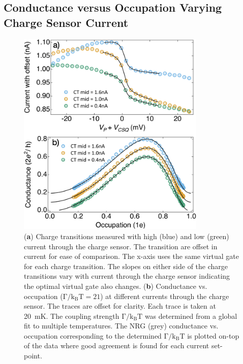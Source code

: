 \subsection{Conductance versus Occupation Varying Charge Sensor Current}



\begin{figure}[!bht]
  \begin{center}
    \includegraphics[width=0.8\textwidth]{figures/ch3/crop_FiguresMaster.017.png}
    \caption[Conductance vs. Occupation : Varying the current through the charge sensor]{\label{fig:ch3/cond_occ_QPC_vs_ct} 
    (\textbf{a}) Charge transitions measured with high (blue) and low (green) current through the charge sensor. The transition are offset in current for ease of comparison. The x-axis uses the same virtual gate for each charge transition. The slopes on either side of the charge transitions vary with current through the charge sensor indicating the optimal virtual gate also changes. (\textbf{b}) Conductance vs. occupation ($\mathrm{\Gamma/k_BT=21}$) at different currents through the charge sensor. The traces are offset for clarity. Each trace is taken at \qty{20}{mK}. The coupling strength $\mathrm{\Gamma/k_BT}$ was determined from a global fit to multiple temperatures. The NRG (grey) conductance vs. occupation corresponding to the determined $\mathrm{\Gamma/k_BT}$ is plotted on-top of the data where good agreement is found for each current set-point.}
  \end{center}
\end{figure}


